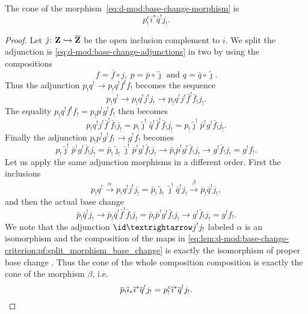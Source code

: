 \begin{Lem}
    \label{lem:d-mod:base-change-criterion}%
    The cone of the morphism~\eqref{eq:d-mod:base-change-morphism} is
    \[
        p^c_! i^* \bar{q}^! j_!.
    \]
\end{Lem}

\begin{proof}
    Let $\tilde\jmath\colon \stack Z \hookrightarrow \bar{\stack Z}$ be the open inclusion complement to $i$.
    We split the adjunction is \eqref{eq:d-mod:base-change-adjunctions} in two by using the compositions 
    \[
        f = \bar f ∘ j
        ,\ 
        p = \bar p ∘ \tilde\jmath
        \text{ and }
        q = \bar q ∘ \tilde\jmath.
    \]
    Thus the adjunction $p_!q^!→ p_!q^!f^!f_!$ becomes the sequence
    \[
        p_!q^! →
        p_!q^! j^! j_! →
        p_!q^! j^! \bar f^! \bar f_! j_!.
    \]
    The equality $p_! q^! f^! f_! = p_! p^! g^! f_!$ then becomes
    \[
        p_! q^! j^! \bar f^! \bar f_! j_! =
        p_! \tilde\jmath^! \bar q^! \bar f^! \bar f_! j_! =
        p_! \tilde\jmath^! \bar p^! g^! \bar f_! j_!.
    \]
    Finally the adjunction $p_! p^! g^! f_! → g^! f_!$ becomes
    \[
        p_! \tilde\jmath^! \bar p^! g^! \bar f_! j_! =
        \bar p_! \tilde\jmath_! \tilde\jmath^! \bar p^! g^! \bar f_! j_! → 
        \bar p_! \bar p^! g^! \bar f_! j_! → 
        g^! \bar f_! j_! = 
        g^! f_!.
    \]
    Let us apply the same adjunction morphisms in a different order.
    First the inclusions
    \[
        p_!q^!
        \xrightarrow{α}
        p_!q^! j^! j_! 
        =
        \bar p_! \tilde\jmath_! \tilde\jmath^! \bar q^! j_! 
        \xrightarrow{β}
        \bar p_! \bar q^! j_!,
    \]
    and then the actual base change
    \begin{equation}
        \label{eq:lem:d-mod:base-change-criterion:pf:split_morphism_base_change}
        \bar p_! \bar q^! j_!
        →
        \bar p_! \bar q^! \bar f^! \bar f_! j_!
        =
        \bar p_! \bar p^! g^! \bar f_! j_!
        →
        g^! \bar f_! j_!
        =
        g^! f_!.
    \end{equation}
    We note that the adjunction $\id → j^!j_!$ labeled $α$ is an isomorphism and the composition of the maps in \eqref{eq:lem:d-mod:base-change-criterion:pf:split_morphism_base_change} is exactly the isomorphism of proper base change \cite[.4.2.1.3]{GaitsgoryRozenblyum:prelim:StudyInDAG}.
    Thus the cone of the whole composition composition is exactly the cone of the morphism $β$, i.e.
    \[
        \bar p_! \tilde\imath_* \tilde\imath^* \bar q^! j_! = p^c_! \tilde\imath^* \bar q^! j_!.
        \qedhere
    \]
\end{proof}

